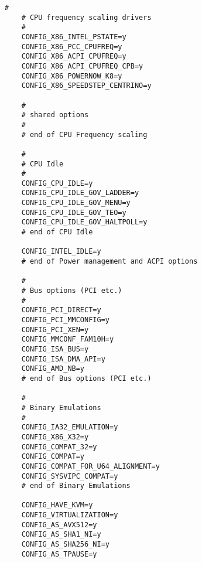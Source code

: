 \begin{multicols}{2}
\begin{lstlisting}[caption=kernel config,label=kconfig,]
    #
    # CPU frequency scaling drivers
    #
    CONFIG_X86_INTEL_PSTATE=y
    CONFIG_X86_PCC_CPUFREQ=y
    CONFIG_X86_ACPI_CPUFREQ=y
    CONFIG_X86_ACPI_CPUFREQ_CPB=y
    CONFIG_X86_POWERNOW_K8=y
    CONFIG_X86_SPEEDSTEP_CENTRINO=y
    
    #
    # shared options
    #
    # end of CPU Frequency scaling
    
    #
    # CPU Idle
    #
    CONFIG_CPU_IDLE=y
    CONFIG_CPU_IDLE_GOV_LADDER=y
    CONFIG_CPU_IDLE_GOV_MENU=y
    CONFIG_CPU_IDLE_GOV_TEO=y
    CONFIG_CPU_IDLE_GOV_HALTPOLL=y
    # end of CPU Idle
    
    CONFIG_INTEL_IDLE=y
    # end of Power management and ACPI options
    
    #
    # Bus options (PCI etc.)
    #
    CONFIG_PCI_DIRECT=y
    CONFIG_PCI_MMCONFIG=y
    CONFIG_PCI_XEN=y
    CONFIG_MMCONF_FAM10H=y
    CONFIG_ISA_BUS=y
    CONFIG_ISA_DMA_API=y
    CONFIG_AMD_NB=y
    # end of Bus options (PCI etc.)
    
    #
    # Binary Emulations
    #
    CONFIG_IA32_EMULATION=y
    CONFIG_X86_X32=y
    CONFIG_COMPAT_32=y
    CONFIG_COMPAT=y
    CONFIG_COMPAT_FOR_U64_ALIGNMENT=y
    CONFIG_SYSVIPC_COMPAT=y
    # end of Binary Emulations
    
    CONFIG_HAVE_KVM=y
    CONFIG_VIRTUALIZATION=y
    CONFIG_AS_AVX512=y
    CONFIG_AS_SHA1_NI=y
    CONFIG_AS_SHA256_NI=y
    CONFIG_AS_TPAUSE=y
    

\end{lstlisting}
\end{multicols}
